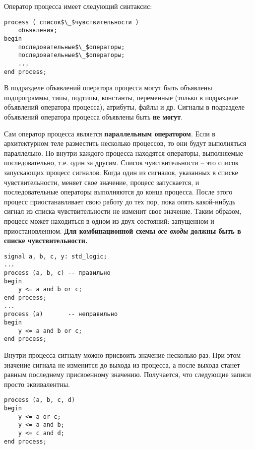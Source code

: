 Оператор процесса имеет следующий синтаксис:

\begin{Code}
\begin{lstlisting}[mathescape]
process ( список$\_$чувствительности )
    объявления;
begin
    последовательные$\_$операторы;
    последовательные$\_$операторы;
    ...
end process;
\end{lstlisting}
\end{Code}

В подразделе объявлений оператора процесса могут быть объявлены подпрограммы, типы, подтипы, константы, переменные (только в подразделе объявлений оператора процесса), атрибуты, файлы и др. Сигналы в подразделе объявлений оператора процесса объявлены быть \textbf{не могут}.

Сам оператор процесса является \textbf{параллельным оператором}. Если в архитектурном теле разместить несколько процессов, то они будут выполняться параллельно. Но внутри каждого процесса находятся операторы, выполняемые последовательно, т.е. один за другим. Список чувствительности – это список запускающих процесс сигналов. Когда один из сигналов, указанных в списке чувствительности, меняет свое значение, процесс запускается, и последовательные операторы выполняются до конца процесса. После этого процесс приостанавливает свою работу до тех пор, пока опять какой-нибудь сигнал из списка чувствительности не изменит свое значение. Таким образом, процесс может находиться в одном из двух состояний: запущенном и приостановленном. \textbf{Для комбинационной схемы \emph{все входы} должны быть в списке чувствительности.} 

\begin{Code}
\begin{lstlisting}
signal a, b, c, y: std_logic;
...
process (a, b, c) -- правильно
begin
    y <= a and b or c;
end process;
...
process (a)       -- неправильно
begin
    y <= a and b or c;
end process;
\end{lstlisting}
\end{Code}

Внутри процесса сигналу можно присвоить значение несколько раз. При этом значение сигнала не изменится до выхода из процесса, а после выхода станет равным последнему присвоенному значению. Получается, что следующие записи просто эквивалентны.

\begin{Code}
\begin{lstlisting}
process (a, b, c, d)
begin
    y <= a or c;
    y <= a and b;
    y <= c and d;
end process;
\end{lstlisting}
\end{Code}

